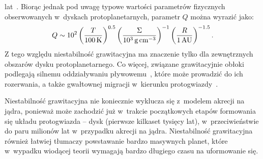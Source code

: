 lat~\cite{HB11, GHB12}. Biorąc jednak pod uwagę typowe wartości parametrów
fizycznych obserwowanych w~dyskach protoplanetarnych, parametr $Q$ można
wyrazić jako:
%
\begin{equation}
   Q \sim 10^2 
   \left(\frac{T}{100\hbox{$\thinspace\textrm{K}$}}\right)^{0.5}
   \left(\frac{\Sigma}{10^3\hbox{$\thinspace\textrm{g}$}\hbox{$\thinspace\textrm{cm}$}^{-3}}\right)^{-1}
   \left(\frac{R}{1\hbox{$\thinspace\textrm{AU}$}}\right)^{-1.5}.
\end{equation}
%
Z tego względu niestabilność grawitacyjna ma znaczenie tylko dla zewnętrznych
obszarów dysku protoplanetarnego. Co więcej, związane grawitacyjnie obłoki
podlegają silnemu oddziaływaniu pływowemu~\cite{VH12}, które może prowadzić do
ich rozerwania, a także gwałtownej migracji w~kierunku protogwiazdy~\cite{BMP11}.
\par Niestabilność grawitacyjna nie koniecznie wyklucza się z~modelem akrecji na
jądra, ponieważ może zachodzić już w~trakcie początkowych etapów formowania się
 układu protogwiazda -- dysk (pierwsze kilkaset tysięcy lat), w~przeciwieństwie do
 paru milionów lat w~przypadku akrecji na jądra. Niestabilność grawitacyjna
 również łatwiej tłumaczy powstawanie bardzo masywnych planet, które w~wypadku
 wiodącej teorii wymagają bardzo długiego czasu na uformowanie się.



